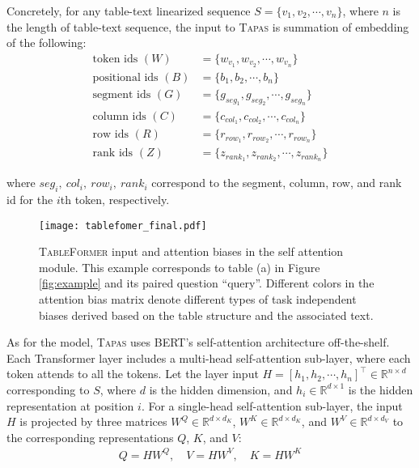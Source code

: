 \documentclass[11pt]{article}
\begin{document}
Concretely, for any table-text linearized sequence $S = \{v_1, v_2, \cdots, v_n\}$, where $n$ is the length of table-text sequence, the input to \textsc{Tapas} is summation of embedding of the following:
\begin{equation*} 
\begin{split}
\text{token ids } (W) & = \{w_{v_1}, w_{v_2}, \cdots, w_{v_n}\} \\
\text{positional ids } (B) & = \{b_1, b_2, \cdots, b_n\}\\ 
\text{segment ids } (G) & = \{g_{seg_1}, g_{seg_2}, \cdots, g_{seg_n}\} \\ 
\text{column ids } (C) & = \{c_{col_1}, c_{col_2}, \cdots, c_{col_n}\}\\ 
\text{row ids } (R) & = \{r_{row_1}, r_{row_2}, \cdots, r_{row_n}\}  \\ 
\text{rank ids } (Z) & = \{z_{rank_1}, z_{rank_2}, \cdots, z_{rank_n}\}
\end{split}
\end{equation*}

where $seg_i,~col_i,~row_i,~rank_i$ correspond to the segment, column, row, and rank id for the $i$th token, respectively.

\begin{figure*}
\begin{center}
\texttt{[image: tablefomer\_final.pdf]}
\end{center}
\caption{\label{fig:model}  \textsc{TableFormer} input and attention biases in the self attention module. This example corresponds to table (a) in Figure \ref{fig:example} and its paired question ``query''. Different colors in the attention bias matrix denote different types of task independent biases derived based on the table structure and the associated text.
}

\end{figure*}


As for the model, \textsc{Tapas} uses  BERT's self-attention architecture \cite{vaswani2017attention} off-the-shelf. Each Transformer layer includes a multi-head self-attention sub-layer, where each token attends to all the tokens.  Let the layer input $H = [h_1, h_2, \cdots, h_n]^\top \in \mathbb{R}^{n\times d}$ corresponding to $S$, where $d$ is the hidden dimension, and $h_i\in \mathbb{R}^{d\times 1}$ is the hidden representation at position $i$. For a single-head self-attention sub-layer, the input $H$ is projected by three matrices $W^Q \in \mathbb{R}^{d\times d_K}$, $W^K \in \mathbb{R}^{d\times d_K}$, and $W^V \in \mathbb{R}^{d\times d_V}$ to the corresponding representations $Q$, $K$, and $V$: 
\begin{equation}
\label{eqp}
\begin{aligned}
Q = H W^Q, \quad V = H W^V, \quad K = H W^K
\end{aligned}
\end{equation}
\end{document}

